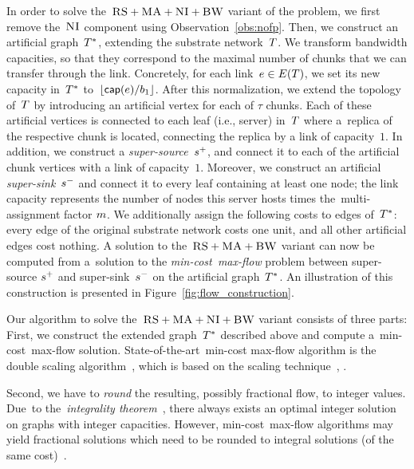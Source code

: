 In order to solve the~$\textsc{RS}+\textsc{MA}+\textsc{NI}+\textsc{BW}$ variant of the {\CTE} problem,
we first remove the~$\textsc{NI}$ component using Observation~\ref{obs:nofp}.
Then, we construct
an artificial graph~$T^*$, extending the substrate network~$T$.
We transform bandwidth capacities, so that they correspond to the maximal number of chunks that we can transfer through the link.
Concretely, for each link~$e\in E(T)$, we set its new
capacity in~$T^*$ to~$\lfloor\textsf{cap}(e) / b_1\rfloor$.
After this normalization, we extend the topology of~$T$ by
introducing an artificial vertex for each of $\tau$ chunks. Each of these artificial
vertices is connected to each leaf (i.e., server) in~$T$ where a~replica
 of the respective chunk is located,
connecting the replica by a link of capacity~$1$. In
addition, we construct a
\emph{super-source}~$s^{+}$, and connect it to each of the artificial chunk
vertices with a link of capacity~$1$. Moreover, we construct an artificial \emph{super-sink}~$s^{-}$ and
connect it to every leaf containing at least one node; the link capacity represents
the number of nodes this server hosts times the~multi-assignment factor
$m$.
We additionally assign the following costs to edges of~$T^*$:
every edge of the original substrate network costs one unit, and all other artificial edges
cost nothing.
A solution to the~$\textsc{RS}+\textsc{MA}+\textsc{BW}$ variant can now be computed
from a~solution to the \emph{min-cost~max-flow} problem between super-source
$s^{+}$ and
super-sink~$s^{-}$ on the artificial graph~$T^*$.
An illustration of this construction is presented in Figure~\ref{fig:flow_construction}.

Our algorithm to solve the~$\textsc{RS}+\textsc{MA}+\textsc{NI}+\textsc{BW}$ variant consists of three parts:
First, we construct the extended graph~$T^*$
described above and compute
a~min-cost~max-flow solution.
State-of-the-art~min-cost max-flow algorithm is the double scaling algorithm~\cite{mincostmaxflow-state}, which is based on the scaling technique~\cite{mincostmaxflow-1,mincostmaxflow-2}, .

Second, we have to \emph{round} the resulting, possibly fractional flow, to
integer values. Due~to the~\emph{integrality theorem}~\cite{flow-book},
there always exists an optimal integer solution on graphs with integer capacities.
However, min-cost~max-flow algorithms may yield fractional solutions
which need to be rounded to integral solutions (of the same cost)~\cite{electric-flows}.

